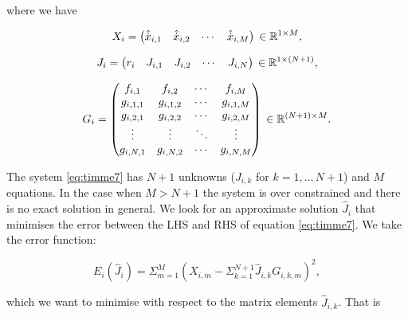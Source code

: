 where we have

\begin{equation}\label{eq:timme8}
X_{i} = 
\begin{pmatrix}
  \hat{\dot{x}}_{i,1} & \hat{\dot{x}}_{i,2} & \cdots & \hat{\dot{x}}_{i,M}
\end{pmatrix}\\
\in{\mathbb{R}^{1 \times M}},
\end{equation}

\begin{equation}\label{eq:timme9}
J_{i} = 
\begin{pmatrix}
  r_i & J_{i,1} & J_{i,2} & \cdots & J_{i,N}
\end{pmatrix}\\
\in{\mathbb{R}^{1 \times(N+1)}},
\end{equation}

\begin{equation}\label{eq:timme10}
G_{i} = 
\begin{pmatrix}
  f_{i,1}  &    f_{i,2} & \cdots & f_{i,M}         \\
  g_{i,1,1} & g_{i,1,2} & \cdots & g_{i,1,M} \\
  g_{i,2,1} & g_{i,2,2} & \cdots & g_{i,2,M} \\
  \vdots    & \vdots    & \ddots & \vdots    \\
  g_{i,N,1} & g_{i,N,2} & \cdots & g_{i,N,M} \\
\end{pmatrix}\\
\in{\mathbb{R}^{(N+1)\times M}}.
\end{equation}


The system \ref{eq:timme7} has $N+1$ unknowns ($J_{i,k}$ for $k=1,..,N+1$) and $M$ equations. In the case when $M>N+1$ the system is over constrained and there is no exact solution in general. We look for an approximate solution $\hat{J}_i$ that minimises the error between the LHS and RHS of equation \ref{eq:timme7}. We take the error function:

\begin{equation}\label{eq:timme11}
E_i(\hat{J}_i) = \Sigma_{m=1}^{M}(X_{i,m} - \Sigma_{k=1}^{N+1}\hat{J}_{i,k}G_{i,k,m})^2,
\end{equation}

which we want to minimise with respect to the matrix elements $\hat{J}_{i,k}$. That is

